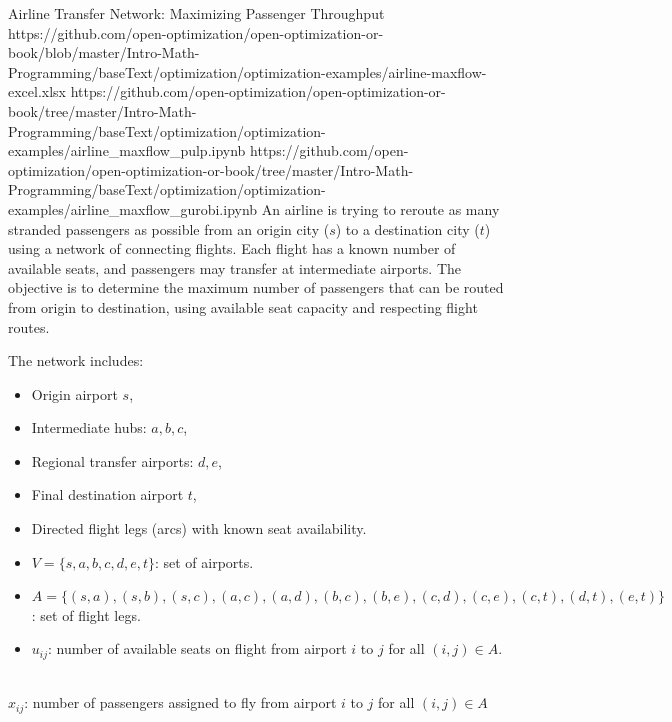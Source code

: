 \begin{examplewithallcode}{Airline Transfer Network: Maximizing Passenger Throughput}
{https://github.com/open-optimization/open-optimization-or-book/blob/master/Intro-Math-Programming/baseText/optimization/optimization-examples/airline-maxflow-excel.xlsx}
{https://github.com/open-optimization/open-optimization-or-book/tree/master/Intro-Math-Programming/baseText/optimization/optimization-examples/airline_maxflow_pulp.ipynb}
{https://github.com/open-optimization/open-optimization-or-book/tree/master/Intro-Math-Programming/baseText/optimization/optimization-examples/airline_maxflow_gurobi.ipynb}
An airline is trying to reroute as many stranded passengers as possible from an origin city (\(s\)) to a destination city (\(t\)) using a network of connecting flights. Each flight has a known number of available seats, and passengers may transfer at intermediate airports. The objective is to determine the maximum number of passengers that can be routed from origin to destination, using available seat capacity and respecting flight routes.

\vspace{0.5em}
The network includes:
\begin{itemize}
    \item Origin airport \(s\),
    \item Intermediate hubs: \(a, b, c\),
    \item Regional transfer airports: \(d, e\),
    \item Final destination airport \(t\),
    \item Directed flight legs (arcs) with known seat availability.
\end{itemize}

\smallskip {}
\begin{itemize}
    \item \( V = \{s, a, b, c, d, e, t\} \): set of airports.
    \item \( A = \{(s,a), (s,b), (s,c), (a,c), (a,d), (b,c), (b,e), (c,d), (c,e), (c,t), (d,t), (e,t)\} \): set of flight legs.
    \item \( u_{ij} \): number of available seats on flight from airport \( i \) to \( j \) for all $(i,j) \in A$.
\end{itemize}

\smallskip {} \\
\( x_{ij} \): number of passengers assigned to fly from airport \( i \) to \( j \) for all $(i,j) \in A$


\end{examplewithallcode}
